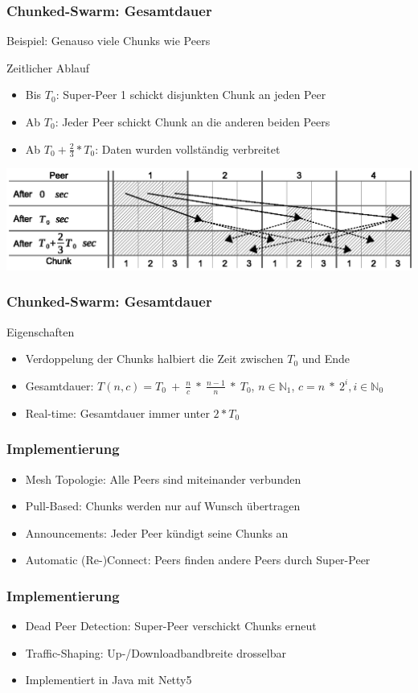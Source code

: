 \begin{frame}
  \frametitle{Chunked-Swarm: Gesamtdauer}
  Beispiel: Genauso viele Chunks wie Peers
  \begin{exampleblock}{Zeitlicher Ablauf}
    \begin{itemize}
      \item Bis $T_0$: Super-Peer 1 schickt disjunkten Chunk an jeden Peer
      \item Ab $T_0$: Jeder Peer schickt Chunk an die anderen beiden Peers
      \item Ab $T_0 + \frac{2}{3} * T_0$: Daten wurden vollständig verbreitet
    \end{itemize}
  \end{exampleblock}
  \begin{center}
    \includegraphics[width=1\textwidth]{fig/chunkedswarmformula1.eps}
  \end{center}
\end{frame}


\begin{frame}
  \frametitle{Chunked-Swarm: Gesamtdauer}
  \begin{block}{Eigenschaften}
    \begin{itemize}  
      \item Verdoppelung der Chunks halbiert die Zeit zwischen $T_0$ und Ende
      \vspace{2mm}
      \item Gesamtdauer: $T(n, c) = T_0\:+\:\frac{n}{c}\:*\:\frac{n-1}{n}\:*\:T_0$, $n \in \mathbb{N}_1$, $c = n\:*\:2^i, i \in \mathbb{N}_0$
      \vspace{2mm}
      \item Real-time: Gesamtdauer immer unter $2 * T_0$
    \end{itemize}
  \end{block}
\end{frame}


\begin{frame}
  \frametitle{Implementierung}
  \begin{itemize}  
    \item Mesh Topologie: Alle Peers sind miteinander verbunden
    \item Pull-Based: Chunks werden nur auf Wunsch übertragen
    \item Announcements: Jeder Peer kündigt seine Chunks an
    \item Automatic (Re-)Connect: Peers finden andere Peers durch Super-Peer
  \end{itemize} 
\end{frame}


\begin{frame}
  \frametitle{Implementierung}
  \begin{itemize}  
    \item Dead Peer Detection: Super-Peer verschickt Chunks erneut
    \item Traffic-Shaping: Up-/Downloadbandbreite drosselbar
    \item Implementiert in Java mit Netty5
  \end{itemize} 
\end{frame}


